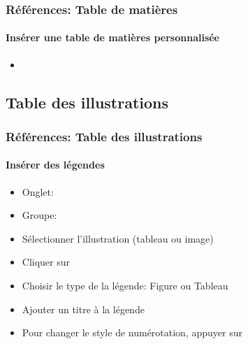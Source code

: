 \documentclass[xcolor=table]{beamer}
\begin{document}
\begin{frame}
\frametitle{Références: Table de matières}
\framesubtitle{Insérer une table de matières personnalisée}

\begin{minipage}{0.59\textwidth}
	\begin{itemize}
		\item 
	\end{itemize}
\end{minipage}
\begin{minipage}{0.40\textwidth}
	
\end{minipage}

\end{frame}

\subsection{Table des illustrations}

\begin{frame}[t]
\frametitle{Références: Table des illustrations}
\framesubtitle{Insérer des légendes}

\begin{minipage}{0.61\textwidth}
	\begin{itemize}
		\item Onglet: 
		\item Groupe: 
		\item Sélectionner l'illustration (tableau ou image)
		\item Cliquer sur 
		\item Choisir le type de la légende: Figure ou Tableau
		\item Ajouter un titre à la légende
		\item Pour changer le style de numérotation, appuyer sur 
	\end{itemize}
\end{minipage}
\begin{minipage}{0.38\textwidth}
	
	
\end{minipage}

\end{frame}
\end{document}
